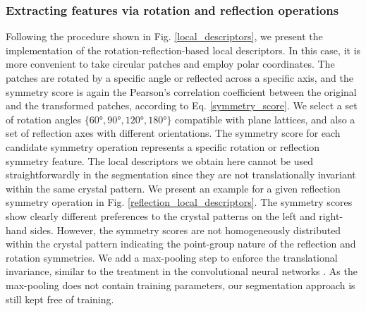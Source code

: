 \documentclass[twocolumn,amsmath, floatfix]{revtex4}
\begin{document}
\subsubsection{Extracting features via rotation and reflection operations}
Following the procedure shown in Fig. \ref{local_descriptors}, we present the implementation of the rotation-reflection-based local descriptors.  In this case, it is more convenient to take circular patches and employ polar coordinates. The patches are rotated by a specific angle or reflected across a specific axis, and the symmetry score is again the Pearson's correlation coefficient between the original and the transformed patches, according to Eq. \eqref{symmetry_score}. We select a set of rotation angles $\{\ang{60},   \ang{90}, \ang{120}, \ang{180}\}$ compatible with plane lattices, and also a set of reflection axes with different orientations. The symmetry score for each candidate symmetry operation represents a specific rotation or reflection symmetry feature.
The local descriptors we obtain here cannot be used straightforwardly in the segmentation since they are not translationally invariant within the same crystal pattern.  We present an example for a given reflection symmetry operation in Fig. \ref{reflection_local_descriptors}. The symmetry scores show clearly different preferences to the crystal patterns on the left and right-hand sides.  However, the symmetry scores are not homogeneously distributed within the crystal pattern indicating the point-group nature of the reflection and rotation symmetries. 
We add a max-pooling step to enforce the translational invariance, similar to the treatment in the convolutional neural networks \cite{Lecun2010}. As the max-pooling does not contain training parameters, our segmentation approach is still kept free of training.
\end{document}
